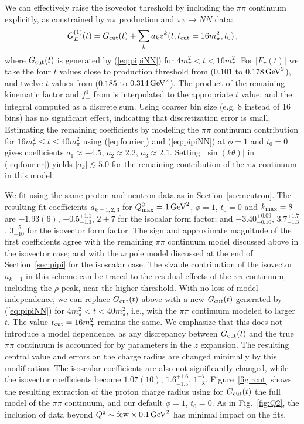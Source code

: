 \documentclass[12pt]{article}
\newcommand{\be}{\begin{equation}}
\newcommand{\ee}{\end{equation}}
\begin{document}
We can effectively raise the isovector threshold by including the $\pi\pi$ continuum 
explicitly, as constrained by $\pi\pi$ production and $\pi\pi \to N\bar{N}$ data: 
\be\label{eq:Gcut}
G^{(1)}_E(t) = G_{\rm cut}(t) + \sum_k a_k z^k(t,t_{\rm cut}=16 m_\pi^2, t_0) \,,
\ee
where $G_{\rm cut}(t)$ is generated by (\ref{eq:pipiNN}) for $4m_\pi^2 < t < 16 m_\pi^2$.  
For $|F_\pi(t)|$ we take the four $t$ values close to production threshold from \cite{Amendolia:1983di} 
($0.101$ to $0.178\,{\rm GeV}^2$), and twelve $t$ values from \cite{Achasov:2005rg} 
($0.185$ to $0.314\,{\rm GeV}^2$).   
The product of the remaining kinematic factor and $f^1_+$ from \cite{Hohler}
is interpolated to the appropriate $t$ value, and the integral computed as a discrete sum. 
Using coarser bin size (e.g. 8 instead of 16 bins) has no significant effect, indicating that
discretization error is small.   
Estimating the remaining coefficients by modeling the 
$\pi\pi$ continuum contribution for $16 m_\pi^2 \le t \le 40 m_\pi^2$ using (\ref{eq:fourier}) and 
(\ref{eq:pipiNN}) at $\phi=1$ and $t_0=0$
gives coefficients 
$a_1\approx -4.5$, $a_2 \approx 2.2$, $a_3\approx 2.1$.   Setting $|\sin(k\theta)|$ in 
(\ref{eq:fourier}) yields $|a_k|\lesssim 5.0$ for the remaining contribution of the $\pi\pi$ continuum 
in this model. 

We fit using the same proton and neutron data as in Section~\ref{sec:neutron}.
The resulting fit coefficients $a_{k=1,2,3}$ for $Q^2_{\rm max}=1\,{\rm GeV}^2$, $\phi=1$, $t_0=0$ and $k_{\rm max}=8$ are 
$-1.93(6)$, $-0.5^{+1.1}_{-1.3}$, $2\pm 7$ for the isocalar form factor;
and 
$-3.40^{+0.09}_{-0.10}$, $3.7^{+1.7}_{-1.3}$, $3^{+5}_{-10}$ for the isovector form factor.   
The sign and approximate magnitude of the first coefficients 
agree with the remaining $\pi\pi$ continuum model discussed above in the isovector case; 
and with the $\omega$ pole model discussed at the end of Section~\ref{sec:pipi} for the isoscalar case.  
The sizable contribution of the isovector $a_{k=1}$ in this scheme can be traced to the residual effects of 
the $\pi\pi$ continuum, including the $\rho$ peak, near the higher threshold.   With no loss 
of model-independence, we can replace $G_{\rm cut}(t)$ above with a new $G_{\rm cut}(t)$ generated 
by (\ref{eq:pipiNN}) for  $4m_\pi^2 < t < 40 m_\pi^2$, i.e., with the $\pi\pi$ continuum modeled to larger $t$.  
The value $t_{\rm cut}=16 m_\pi^2$ remains the same. 
We emphasize that this does not introduce a model dependence, as any discrepancy between $G_{\rm cut}(t)$ and the 
true $\pi\pi$ continuum is accounted for by parameters in the $z$ expansion. 
The resulting central value and errors on the charge radius are changed minimally by 
this modification.  The isoscalar coefficients are also not significantly changed, while
the isovector coefficients become $1.07(10)$, $1.6^{+1.6}_{-1.5}$, $1^{+7}_{-8}$.   
Figure~\ref{fig:rcut} shows the resulting extraction of the proton charge radius 
using for $G_{\rm cut}(t)$ the full model of the $\pi\pi$ continuum, and our default 
$\phi=1$, $t_0=0$.   As in Fig.~\ref{fig:Q2}, the inclusion of data beyond 
$Q^2 \sim {\rm few}\times 0.1\,{\rm GeV}^2$ has minimal impact on the fits.  
\end{document}

